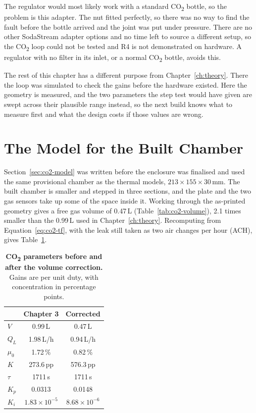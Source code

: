 The regulator would most likely work with a standard CO\textsubscript{2} bottle, so the problem is this adapter. The nut fitted perfectly, so there was no way to find the fault before the bottle arrived and the joint was put under pressure. There are no other SodaStream adapter options and no time left to source a different setup, so the CO\textsubscript{2} loop could not be tested and R4 is not demonstrated on hardware. A regulator with no filter in its inlet, or a normal CO\textsubscript{2} bottle, avoids this.

The rest of this chapter has a different purpose from Chapter~\ref{ch:theory}. There the loop was simulated to check the gains before the hardware existed. Here the geometry is measured, and the two parameters the step test would have given are swept across their plausible range instead, so the next build knows what to measure first and what the design costs if those values are wrong.

\section{The Model for the Built Chamber}
\label{sec:co2-params}
Section~\ref{sec:co2-model} was written before the enclosure was finalised and used the same provisional chamber as the thermal models, $213 \times 155 \times 30$\,mm. The built chamber is smaller and stepped in three sections, and the plate and the two gas sensors take up some of the space inside it. Working through the as-printed geometry gives a free gas volume of 0.47\,L (Table~\ref{tab:co2-volume}), 2.1 times smaller than the 0.99\,L used in Chapter~\ref{ch:theory}. Recomputing from Equation~\ref{eq:co2-tf}, with the leak still taken as two air changes per hour (ACH), gives Table~\ref{tab:co2-gains}.

\begin{table}[htbp]
    \centering
    \caption[CO\textsubscript{2} parameters before and after the volume correction]{\textbf{CO\textsubscript{2} parameters before and after the volume correction.} Gains are per unit duty, with concentration in percentage points.}
    \label{tab:co2-gains}
    \small
    \begin{tabular}{@{}lcc@{}}
        \toprule
         & \textbf{Chapter 3} & \textbf{Corrected} \\
        \midrule
        $V$       & 0.99\,L & 0.47\,L \\
        $Q_L$     & 1.98\,L/h & 0.94\,L/h \\
        $\mu_0$   & 1.72\,\% & 0.82\,\% \\
        $K$       & 273.6\,pp & 576.3\,pp \\
        $\tau$    & 1711\,s & 1711\,s \\
        \midrule
        $K_p$     & 0.0313 & 0.0148 \\
        $K_i$     & $1.83\times10^{-5}$ & $8.68\times10^{-6}$ \\
        \bottomrule
    \end{tabular}
\end{table}

